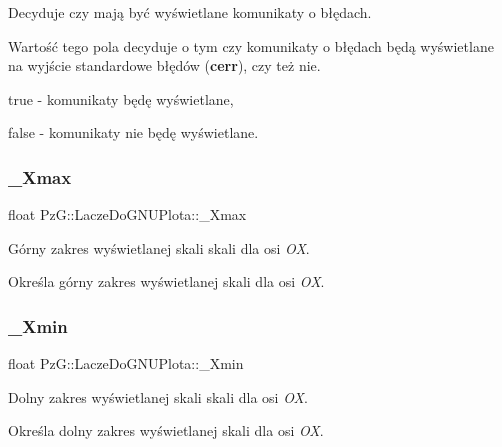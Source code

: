 Decyduje czy mają być wyświetlane komunikaty o błędach. 

Wartość tego pola decyduje o tym czy komunikaty o błędach będą wyświetlane na wyjście standardowe błędów ({\bfseries{cerr}}), czy też nie. \begin{DoxyItemize}
\item {\ttfamily true} -\/ komunikaty będę wyświetlane, \item {\ttfamily false} -\/ komunikaty nie będę wyświetlane. \end{DoxyItemize}
\mbox{\label{class_pz_g_1_1_lacze_do_g_n_u_plota_a847e00678a413ab076ccbcb7eba3ae58}} 
\subsubsection{\texorpdfstring{\_Xmax}{\_Xmax}}
{\footnotesize\ttfamily float Pz\+G\+::\+Lacze\+Do\+G\+N\+U\+Plota\+::\+\_\+\+Xmax\hspace{0.3cm}{\ttfamily [protected]}}



Górny zakres wyświetlanej skali skali dla osi {\itshape OX}. 

Określa górny zakres wyświetlanej skali dla osi {\itshape OX}. \mbox{\label{class_pz_g_1_1_lacze_do_g_n_u_plota_a69d530edfe769e38448972e897456deb}} 
\subsubsection{\texorpdfstring{\_Xmin}{\_Xmin}}
{\footnotesize\ttfamily float Pz\+G\+::\+Lacze\+Do\+G\+N\+U\+Plota\+::\+\_\+\+Xmin\hspace{0.3cm}{\ttfamily [protected]}}



Dolny zakres wyświetlanej skali skali dla osi {\itshape OX}. 

Określa dolny zakres wyświetlanej skali dla osi {\itshape OX}. \mbox{\label{class_pz_g_1_1_lacze_do_g_n_u_plota_a21e77f0a2bfb7fed989b6dc2d64b5a7e}} 

